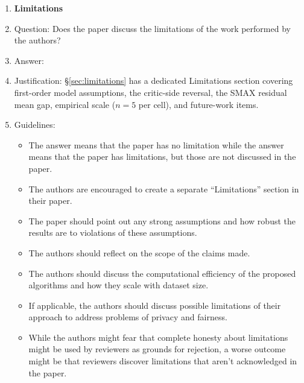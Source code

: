 \begin{enumerate}
\item {\bf Limitations}
    \item[] Question: Does the paper discuss the limitations of the work performed by the authors?
    \item[] Answer: \answerYes{}
    \item[] Justification: \S\ref{sec:limitations} has a dedicated Limitations section covering first-order model assumptions, the critic-side reversal, the SMAX residual mean gap, empirical scale ($n{=}5$ per cell), and future-work items.
    \item[] Guidelines:
    \begin{itemize}
        \item The answer \answerNA{} means that the paper has no limitation while the answer \answerNo{} means that the paper has limitations, but those are not discussed in the paper.
        \item The authors are encouraged to create a separate ``Limitations'' section in their paper.
        \item The paper should point out any strong assumptions and how robust the results are to violations of these assumptions.
        \item The authors should reflect on the scope of the claims made.
        \item The authors should discuss the computational efficiency of the proposed algorithms and how they scale with dataset size.
        \item If applicable, the authors should discuss possible limitations of their approach to address problems of privacy and fairness.
        \item While the authors might fear that complete honesty about limitations might be used by reviewers as grounds for rejection, a worse outcome might be that reviewers discover limitations that aren't acknowledged in the paper.
    \end{itemize}


\end{enumerate}
